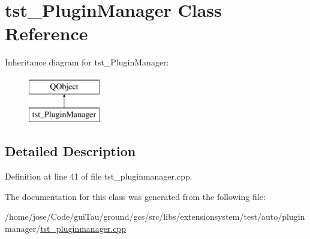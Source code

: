 \hypertarget{classtst___plugin_manager}{\section{tst\-\_\-\-Plugin\-Manager Class Reference}
\label{classtst___plugin_manager}
}
Inheritance diagram for tst\-\_\-\-Plugin\-Manager\-:\begin{figure}[H]
\begin{center}
\leavevmode
\includegraphics[height=2.000000cm]{classtst___plugin_manager}
\end{center}
\end{figure}


\subsection{Detailed Description}


Definition at line 41 of file tst\-\_\-pluginmanager.\-cpp.



The documentation for this class was generated from the following file\-:\begin{DoxyCompactItemize}
\item 
/home/jose/\-Code/gui\-Tau/ground/gcs/src/libs/extensionsystem/test/auto/pluginmanager/\hyperlink{tst__pluginmanager_8cpp}{tst\-\_\-pluginmanager.\-cpp}\end{DoxyCompactItemize}
